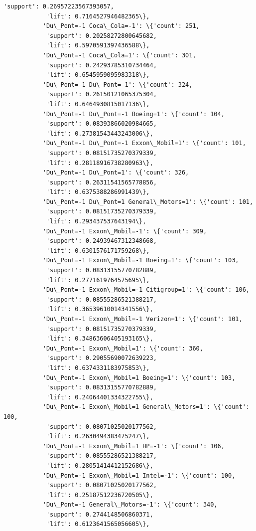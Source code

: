 \documentclass[11pt]{article}
\begin{document}
\begin{Verbatim}[commandchars=\\\{\}]
            'support': 0.26957223567393057,
            'lift': 0.7164527946482365\},
           'Du\_Pont=-1 Coca\_Cola=-1': \{'count': 251,
            'support': 0.20258272800645682,
            'lift': 0.5970591397436588\},
           'Du\_Pont=-1 Coca\_Cola=1': \{'count': 301,
            'support': 0.24293785310734464,
            'lift': 0.6545959095983318\},
           'Du\_Pont=-1 Du\_Pont=-1': \{'count': 324,
            'support': 0.26150121065375304,
            'lift': 0.6464930815017136\},
           'Du\_Pont=-1 Du\_Pont=-1 Boeing=1': \{'count': 104,
            'support': 0.08393866020984665,
            'lift': 0.27381543443243006\},
           'Du\_Pont=-1 Du\_Pont=-1 Exxon\_Mobil=1': \{'count': 101,
            'support': 0.08151735270379339,
            'lift': 0.28118916738280963\},
           'Du\_Pont=-1 Du\_Pont=1': \{'count': 326,
            'support': 0.26311541565778856,
            'lift': 0.6375388286991439\},
           'Du\_Pont=-1 Du\_Pont=1 General\_Motors=1': \{'count': 101,
            'support': 0.08151735270379339,
            'lift': 0.293437537643194\},
           'Du\_Pont=-1 Exxon\_Mobil=-1': \{'count': 309,
            'support': 0.24939467312348668,
            'lift': 0.6301576171759268\},
           'Du\_Pont=-1 Exxon\_Mobil=-1 Boeing=1': \{'count': 103,
            'support': 0.08313155770782889,
            'lift': 0.2771619764575695\},
           'Du\_Pont=-1 Exxon\_Mobil=-1 Citigroup=1': \{'count': 106,
            'support': 0.08555286521388217,
            'lift': 0.36539610014341556\},
           'Du\_Pont=-1 Exxon\_Mobil=-1 Verizon=1': \{'count': 101,
            'support': 0.08151735270379339,
            'lift': 0.34863606405193165\},
           'Du\_Pont=-1 Exxon\_Mobil=1': \{'count': 360,
            'support': 0.29055690072639223,
            'lift': 0.6374331183975853\},
           'Du\_Pont=-1 Exxon\_Mobil=1 Boeing=1': \{'count': 103,
            'support': 0.08313155770782889,
            'lift': 0.24064401334322755\},
           'Du\_Pont=-1 Exxon\_Mobil=1 General\_Motors=1': \{'count': 100,
            'support': 0.08071025020177562,
            'lift': 0.2630494383475247\},
           'Du\_Pont=-1 Exxon\_Mobil=1 HP=-1': \{'count': 106,
            'support': 0.08555286521388217,
            'lift': 0.28051414412152686\},
           'Du\_Pont=-1 Exxon\_Mobil=1 Intel=-1': \{'count': 100,
            'support': 0.08071025020177562,
            'lift': 0.25187512236720505\},
           'Du\_Pont=-1 General\_Motors=-1': \{'count': 340,
            'support': 0.2744148506860371,
            'lift': 0.6123641565056605\},

\end{Verbatim}
\end{document}
